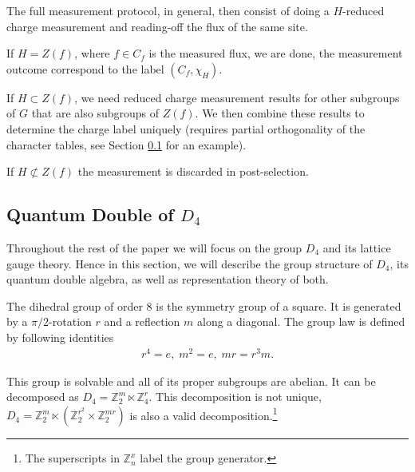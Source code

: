 \documentclass[two column]{article}
\begin{document}
The full measurement protocol, in general, then consist of doing a $H$-reduced charge measurement and reading-off the flux of the same site. 

If $H = Z(f)$, where $f \in C_f$ is the measured flux, we are done, the measurement outcome correspond to the label $(C_f, \chi_H)$.

If $H \subset Z(f)$, we need reduced charge measurement results for other subgroups of $G$ that are also subgroups of $Z(f)$. We then combine these results to determine the charge label uniquely (requires partial orthogonality of the character tables, see Section \ref{sec:D4_double} for an example).

If $H \not\subset Z(f)$ the measurement is discarded in post-selection.


\subsection{Quantum Double of $D_4$}\label{sec:D4_double}

Throughout the rest of the paper we will focus on the group $D_4$ and its lattice gauge theory.
Hence in this section, we will describe the group structure of $D_4$, its quantum double algebra, as well as representation theory of both.

The dihedral group of order 8 is the symmetry group of a square. It is generated by a $\pi/2$-rotation $r$ and a reflection  $m$ along a diagonal.
The group law is defined by following identities
\begin{equation}
	\begin{split}
		r^4 = e,\;
		m^2 = e,	\;	mr = r^3m. \label{eqn:group}
	\end{split}
\end{equation}

This group is solvable and all of its proper subgroups are abelian. It can be decomposed as $D_4 = \mathbb{Z}^m_2 \ltimes \mathbb{Z}^r_4$.
This decomposition is not unique, $D_4 = \mathbb{Z}_2^m\ltimes(\mathbb{Z}_2^{r^2}\times\mathbb{Z}^{mr}_2)$ is also a valid decomposition.\footnote{The superscripts in $\mathbb{Z}_n^x$ label the group generator.}
\end{document}
